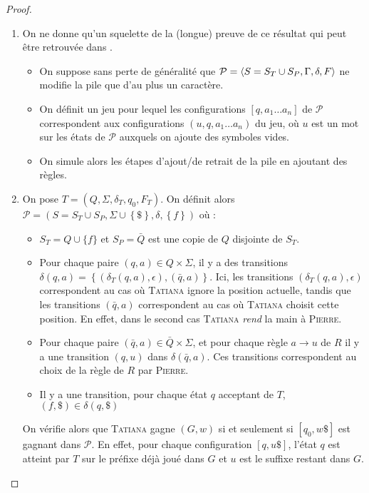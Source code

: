 \documentclass{cours}
\begin{document}
\begin{proof}
    \begin{enumerate}
        \item On ne donne qu'un squelette de la (longue) preuve de ce résultat qui peut être retrouvée dans \cite{cfgames}. 
        \begin{itemize}
            \item On suppose sans perte de généralité que $\mathcal{P} = \left\langle S = S_{T} \cup S_{P}, \Gamma, \delta, F \right\rangle$ ne modifie la pile que d'au plus un caractère. 
            \item On définit un jeu pour lequel les configurations $\left[q, a_{1}\ldots a_{n}\right]$ de $\mathcal{P}$ correspondent aux configurations $\left(u, \boxed{q, a_{1}}\ldots a_{n}\right)$ du jeu, où $u$ est un mot sur les états de $\mathcal{P}$ auxquels on ajoute des symboles vides.
            \item On simule alors les étapes d'ajout/de retrait de la pile en ajoutant des règles. 
        \end{itemize}
        \item On pose $T = \left(Q, \Sigma, \delta_{T}, q_{0}, F_{T}\right)$. On définit alors $\mathcal{P} = \left(S = S_{T} \cup S_{P}, \Sigma \cup \left\{\$\right\}, \delta, \left\{f\right\}\right)$ où : 
        \begin{itemize}
            \item $S_{T} = Q \cup \{f\}$ et $S_{P} = \bar{Q}$ est une copie de $Q$ disjointe de $S_{T}$.
            \item Pour chaque paire $(q, a) \in Q \times \Sigma$, il y a des transitions $\delta(q, a) = \left\{\left(\delta_{T}(q, a), \epsilon\right), \left(\bar{q}, a\right)\right\}$. Ici, les transitions $\left(\delta_{T}(q, a), \epsilon\right)$ correspondent au cas où \textsc{Tatiana} ignore la position actuelle, tandis que les transitions $(\bar{q}, a)$ correspondent au cas où \textsc{Tatiana} choisit cette position. En effet, dans le second cas \textsc{Tatiana} \textit{rend} la main à \textsc{Pierre}.
            \item Pour chaque paire $(\bar{q}, a) \in \bar{Q} \times \Sigma$, et pour chaque règle $a \rightarrow u$ de $R$ il y a une transition $\left(q, u\right)$ dans $\delta(\bar{q}, a)$. Ces transitions correspondent au choix de la règle de $R$ par \textsc{Pierre}.
            \item Il y a une transition, pour chaque état $q$ acceptant de $T$, $\left(f, \$\right) \in \delta(q, \$)$
        \end{itemize}
        On vérifie alors que \textsc{Tatiana} gagne $\left(G, w\right)$ si et seulement si $\left[q_{0}, w\$\right]$ est gagnant dans $\mathcal{P}$. En effet, pour chaque configuration $\left[q, u\$\right]$, l'état $q$ est atteint par $T$ sur le préfixe déjà joué dans $G$ et $u$ est le suffixe restant dans $G$.
    \end{enumerate}
\end{proof}
\end{document}
